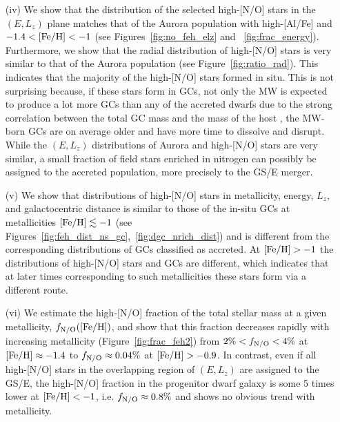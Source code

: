 \documentclass[a4paper,useAMS,usenatbib]{mnras}
\begin{document}
\begin{itemize}
    \item[(iv)] We show that the distribution of the selected high-[N/O] stars in the $(E, L_z)$ plane matches that of the Aurora population with high-[Al/Fe] and $-1.4<\rm [Fe/H]<-1$  (see Figures~\ref{fig:no_feh_elz} and ~\ref{fig:frac_energy}). Furthermore, we show that the radial distribution of high-[N/O] stars is very similar to that of the Aurora population (see Figure~\ref{fig:ratio_rad}). This indicates that the majority of the high-[N/O] stars formed in situ. This is not surprising because, if these stars form in GCs, not only the MW is expected to produce a lot more GCs than any of the accreted dwarfs due to the strong correlation between the total GC mass and the mass of the host \citep[e.g.,][]{Hudson.etal.2014,Forbes.etal.2018}, the MW-born GCs are on average older and have more time to dissolve and disrupt. While the $(E, L_z)$ distributions of Aurora and high-[N/O] stars are very similar, a small fraction of field stars enriched in nitrogen can possibly be assigned to the accreted population, more precisely to the GS/E merger. \\

    \item[(v)] We show that distributions of high-[N/O] stars in metallicity, energy, $L_z$, and galactocentric distance is similar to those of the in-situ GCs at metallicities $\rm [Fe/H]\lesssim -1$ (see Figures~\ref{fig:feh_dist_ns_gc},~\ref{fig:dgc_nrich_dist}) and is different from the corresponding distributions of GCs classified as accreted. At   $\rm [Fe/H]> -1$ the distributions of high-[N/O] stars and GCs are different, which indicates that at later times corresponding to such metallicities these stars form via a different route. \\
    
    \item[(vi)] We estimate the high-[N/O] fraction of the total stellar mass at a given metallicity, $f_{\rm N/O}\rm([Fe/H])$, and show that this fraction decreases rapidly with increasing metallicity (Figure~\ref{fig:frac_feh2}) from $2\%<f_{\rm N/O}<4\%$ at $\rm [Fe/H] \approx-1.4$ to $f_{\rm N/O}\approx0.04\%$ at $\rm [Fe/H]>-0.9$. In contrast, even if all high-[N/O] stars in the overlapping region of $(E, L_z)$ are assigned to the GS/E, the high-[N/O] fraction in the progenitor dwarf galaxy is some 5 times lower at $\rm [Fe/H]<-1$, i.e. $f_{\rm N/O}\approx0.8\%$ and shows no obvious trend with metallicity. \\
    

\end{itemize}
\end{document}
